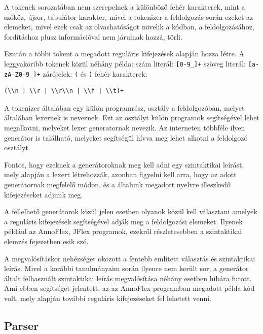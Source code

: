 A tokenek sorozatában nem szerepelnek a különböző fehér karakterek, mint a szóköz, újsor, tabulátor karakter, mivel a tokenizer a feldolgozás során ezeket az elemeket, mivel ezek csak az olvashatóságot növelik a kódban, a feldolgozásához, fordításhoz plusz információval nem járulnak hozzá, törli.

Ezután a többi tokent a megadott reguláris kifejezések alapján hozza létre. A leggyakoribb tokenek közül néhány példa:
szám literál: \texttt{[0-9\_]+}
szöveg literál: \texttt{[a-zA-Z0-9\_]+}
zárójelek: \texttt{(} és \texttt{)}
fehér karakterek:
\begin{verbatim}
(\\n | \\r | \\r\\n | \\f | \\t)+
\end{verbatim}

A tokenizer általában egy külön programrész, osztály a feldolgozóban, melyet általában lexernek is neveznek. Ezt az osztályt külön programok segítségével lehet megalkotni, melyeket lexer generatornak nevezik. Az interneten többféle ilyen generátor is található, melyeket segítségül hívva meg lehet alkotni a feldolgozó osztályt.

Fontos, hogy ezeknek a generátoroknak meg kell adni egy szintaktikai leírást, mely alapján a lexert létrehozzák, azonban figyelni kell arra, hogy az adott generátornak megfelelő módon, és a általunk megadott nyelvre illeszkedő kifejezéseket adjunk meg.

A fellelhető generátorok közül jelen esetben olyanok közül kell választani amelyek a reguláris kifejezések segítségével adják meg a feldolgozási elemeket. Ilyenek  például az AnnoFlex, JFlex programok, ezekről részletesebben a szintaktikai elemzés fejezetben esik szó.

A megvalósításkor nehézséget okozott a fentebb említett választás és szintaktikai leírás. Mivel a korábbi tanulmányaim során ilyenre nem került sor, a generátor általt felhasznált szintaktikai leírás megvalósítása néhány esetben hibára futott. Ami ebben segítséget jelentett, az az AnnoFlex programban megadott példa kód volt, mely alapján további reguláris kifejezéseket fel lehetett venni.

\subsection{Parser}

